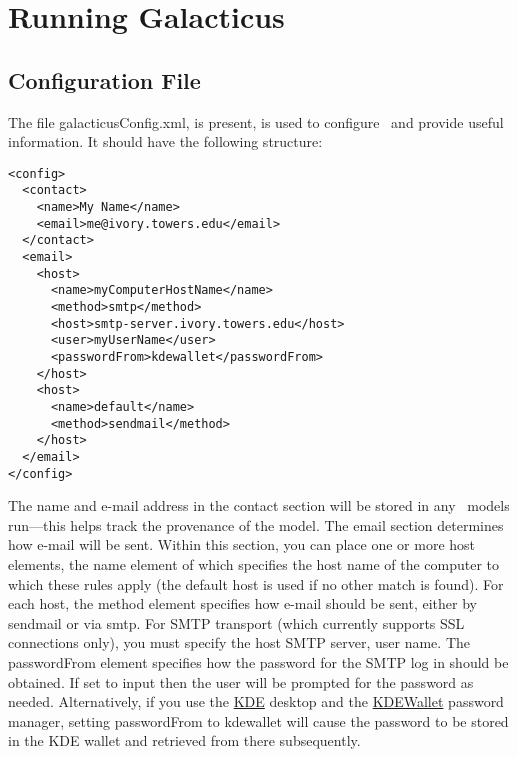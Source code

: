 \chapter{Running Galacticus}

\section{Configuration File}\label{sec:ConfigFile}

The file {\normalfont \ttfamily galacticusConfig.xml}, is present, is used to configure \glc\ and provide useful information. It should have the following structure:
\begin{verbatim}
<config>
  <contact>
    <name>My Name</name>
    <email>me@ivory.towers.edu</email>
  </contact>
  <email>
    <host>
      <name>myComputerHostName</name>
      <method>smtp</method>
      <host>smtp-server.ivory.towers.edu</host>
      <user>myUserName</user>
      <passwordFrom>kdewallet</passwordFrom>
    </host>
    <host>
      <name>default</name>
      <method>sendmail</method>
    </host>
  </email>
</config>
\end{verbatim}
The name and e-mail address in the {\normalfont \ttfamily contact} section will be stored in any \glc\ models run---this helps track the provenance of the model. The {\normalfont \ttfamily email} section determines how e-mail will be sent. Within this section, you can place one or more {\normalfont \ttfamily host} elements, the {\normalfont \ttfamily name} element of which specifies the host name of the computer to which these rules apply (the {\normalfont \ttfamily default} host is used if no other match is found). For each host, the {\normalfont \ttfamily method} element specifies how e-mail should be sent, either by {\normalfont \ttfamily sendmail} or via {\normalfont \ttfamily smtp}. For SMTP transport (which currently supports SSL connections only), you must specify the {\normalfont \ttfamily host} SMTP server, {\normalfont \ttfamily user} name. The {\normalfont \ttfamily passwordFrom} element specifies how the password for the SMTP log in should be obtained. If set to {\normalfont \ttfamily input} then the user will be prompted for the password as needed. Alternatively, if you use the \href{http://www.kde.org/}{KDE} desktop and the \href{http://utils.kde.org/projects/kwalletmanager/}{KDEWallet} password manager, 
setting {\normalfont \ttfamily passwordFrom} to {\normalfont \ttfamily kdewallet} will cause the password to be stored in the KDE wallet and retrieved from there subsequently.

